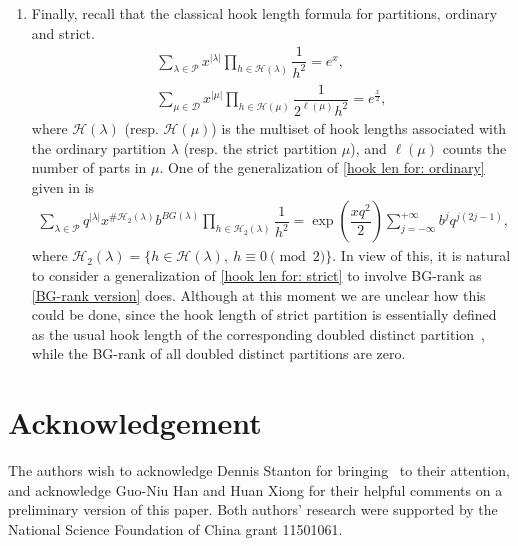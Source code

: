 \documentclass[12pt,reqno]{amsart}
\numberwithin{equation}{section}
\theoremstyle{plain}
\theoremstyle{definition}
\begin{document}
\begin{enumerate}[1)]
\item Finally, recall that the classical hook length formula for partitions, ordinary and strict.
\begin{align}
\sum_{\lambda\in\mathcal{P}}x^{|\lambda|}\prod_{h\in\mathcal{H}(\lambda)}\dfrac{1}{h^{2}}=e^{x}, \label{hook len for: ordinary}\\
\sum_{\mu\in\mathcal{D}}x^{|\mu|}\prod_{h\in\mathcal{H}(\mu)}\dfrac{1}{2^{\ell(\mu)}h^{2}}=e^{\frac{x}{2}}, \label{hook len for: strict}
\end{align}
where $\mathcal{H}(\lambda)$ (resp. $\mathcal{H}(\mu)$) is the multiset of hook lengths associated with the ordinary partition $\lambda$ (resp. the strict partition $\mu$), and $\ell(\mu)$ counts the number of parts in $\mu$. One of the generalization of \eqref{hook len for: ordinary} given in \cite[Theorem 4.2]{HJ2011} is
\begin{align}
\sum_{\lambda\in\mathcal{P}}q^{|\lambda|}x^{\#\mathcal{H}_{2}(\lambda)}b^{BG(\lambda)}\prod_{h\in\mathcal{H}_{2}(\lambda)}\dfrac{1}{h^{2}}=\exp
\left(\dfrac{xq^{2}}{2}\right)\sum_{j=-\infty}^{+\infty}b^{j}q^{j(2j-1)},\label{BG-rank version}
\end{align}
where $\mathcal{H}_{2}(\lambda)=\{h\in\mathcal{H}(\lambda),~h\equiv0\pmod{2}\}$. In view of this, it is natural to consider a generalization of \eqref{hook len for: strict} to involve BG-rank as \eqref{BG-rank version} does. Although at this moment we are unclear how this could be done, since the hook length of strict partition is essentially defined as the usual hook length of the corresponding doubled distinct partition~\cite{HX2016}, while the BG-rank of all doubled distinct partitions are zero.
\end{enumerate}


\section*{Acknowledgement}
The authors wish to acknowledge Dennis Stanton for bringing~\cite{HSWW} to their attention, and acknowledge Guo-Niu Han and Huan Xiong for their helpful comments on a preliminary version of this paper. Both authors' research were supported by the National Science Foundation of China grant 11501061.
\end{document}
